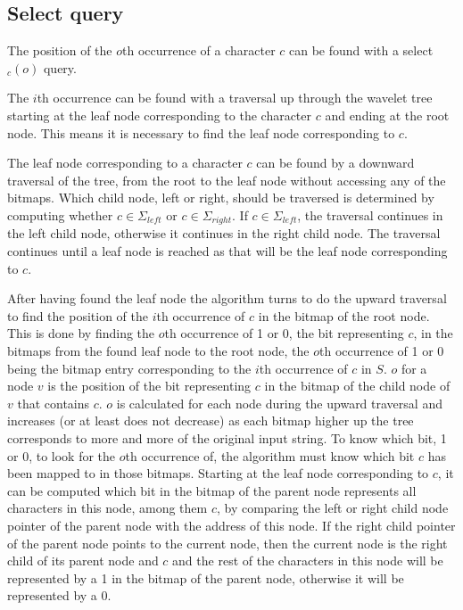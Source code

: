 \subsection{Select query}
\label{sec:selectDescription}
The position of the $o$th occurrence of a character $c$ can be found with a select$_c(o)$ query.


The $i$th occurrence can be found with a traversal up through the wavelet tree starting at the leaf node corresponding to the character $c$ and ending at the root node.
This means it is necessary to find the leaf node corresponding to $c$.

The leaf node corresponding to a character $c$ can be found by a downward traversal of the tree, from the root to the leaf node without accessing any of the bitmaps.
Which child node, left or right, should be traversed is determined by computing whether $c \in \Sigma_{left}$ or $c \in \Sigma_{right}$.
If $c \in \Sigma_{left}$, the traversal continues in the left child node, otherwise it continues in the right child node.
The traversal continues until a leaf node is reached as that will be the leaf node corresponding to $c$.



After having found the leaf node the algorithm turns to do the upward traversal to find the position of the $i$th occurrence of $c$ in the bitmap of the root node.
This is done by finding the $o$th occurrence of 1 or 0, the bit representing $c$, in the bitmaps from the found leaf node to the root node, the $o$th occurrence of 1 or 0 being the bitmap entry corresponding to the $i$th occurrence of $c$ in $S$.
$o$ for a node $v$ is the position of the bit representing $c$ in the bitmap of the child node of $v$ that contains $c$.
$o$ is calculated for each node during the upward traversal and increases (or at least does not decrease) as each bitmap higher up the tree corresponds to more and more of the original input string.
To know which bit, 1 or 0, to look for the $o$th occurrence of, the algorithm must know which bit $c$ has been mapped to in those bitmaps.
Starting at the leaf node corresponding to $c$, it can be computed which bit in the bitmap of the parent node represents all characters in this node, among them $c$, by comparing the left or right child node pointer of the parent node with the address of this node.
If the right child pointer of the parent node points to the current node, then the current node is the right child of its parent node and $c$ and the rest of the characters in this node will be represented by a 1 in the bitmap of the parent node, otherwise it will be represented by a 0.

